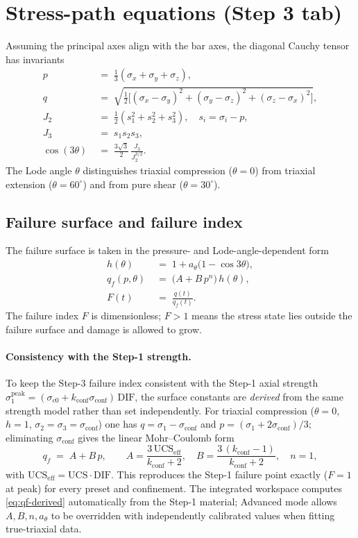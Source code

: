 \documentclass[11pt,a4paper,openany]{book}
\theoremstyle{handbook}
\newcommand{\sig}{\sigma}
\begin{document}
\section{Stress-path equations (Step 3 tab)}

Assuming the principal axes align with the bar axes, the diagonal Cauchy
tensor has invariants
\begin{align}
  p   &\;=\; \tfrac{1}{3}(\sig_x+\sig_y+\sig_z), \\
  q   &\;=\; \sqrt{\tfrac{1}{2}\bigl[(\sig_x-\sig_y)^{2}+(\sig_y-\sig_z)^{2}+(\sig_z-\sig_x)^{2}\bigr]}, \\
  J_2 &\;=\; \tfrac{1}{2}(s_1^{2}+s_2^{2}+s_3^{2}), \quad s_i=\sig_i-p, \\
  J_3 &\;=\; s_1 s_2 s_3, \\
  \cos(3\theta) &\;=\; \frac{3\sqrt{3}}{2}\,\frac{J_3}{J_2^{3/2}}.
\end{align}
The Lode angle $\theta$ distinguishes triaxial compression ($\theta=0$)
from triaxial extension ($\theta=60^{\circ}$) and from pure shear
($\theta=30^{\circ}$).

\subsection{Failure surface and failure index}

The failure surface is taken in the pressure- and Lode-angle-dependent form
\begin{align}
  h(\theta) &\;=\; 1 + a_\theta\bigl(1-\cos 3\theta\bigr), \\
  q_f(p,\theta) &\;=\; \bigl(A + B\,p^{n}\bigr)\,h(\theta), \\
  F(t) &\;=\; \frac{q(t)}{q_f(t)}.
\end{align}
The failure index $F$ is dimensionless; $F>1$ means the stress state lies
outside the failure surface and damage is allowed to grow.

\paragraph{Consistency with the Step-1 strength.} To keep the Step-3 failure
index consistent with the Step-1 axial strength
$\sig_1^{\text{peak}}=(\sig_{c0}+k_{\text{conf}}\sig_{\text{conf}})\,\text{DIF}$,
the surface constants are \emph{derived} from the same strength model rather
than set independently. For triaxial compression ($\theta=0$, $h=1$,
$\sig_2=\sig_3=\sig_{\text{conf}}$) one has $q=\sig_1-\sig_{\text{conf}}$ and
$p=(\sig_1+2\sig_{\text{conf}})/3$; eliminating $\sig_{\text{conf}}$ gives the
linear Mohr--Coulomb form
\begin{equation}
  q_f \;=\; A + B\,p, \qquad
  A=\frac{3\,\text{UCS}_{\text{eff}}}{k_{\text{conf}}+2}, \quad
  B=\frac{3\,(k_{\text{conf}}-1)}{k_{\text{conf}}+2}, \quad n=1,
  \label{eq:qf-derived}
\end{equation}
with $\text{UCS}_{\text{eff}}=\text{UCS}\cdot\text{DIF}$. This reproduces the
Step-1 failure point exactly ($F=1$ at peak) for every preset and confinement.
The integrated workspace computes \eqref{eq:qf-derived} automatically from the
Step-1 material; Advanced mode allows $A,B,n,a_\theta$ to be overridden with
independently calibrated values when fitting true-triaxial data.
\end{document}
